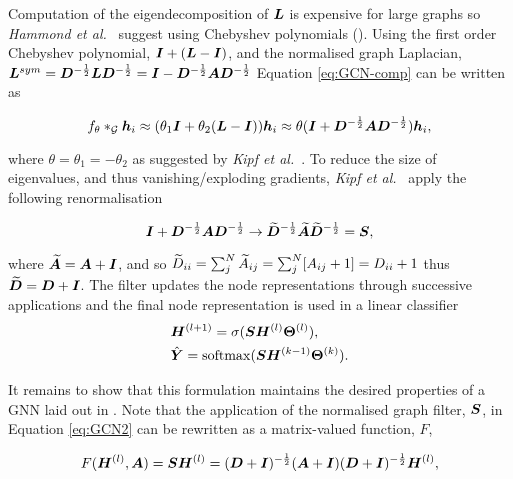 Computation of the eigendecomposition of ${\bm{L}}$ is expensive for large graphs so \textit{Hammond et al.}~\cite{hammond2011wavelets} suggest using Chebyshev polynomials ().
Using the first order Chebyshev polynomial, ${\bm{I}} + ({\bm{L}} - {\bm{I}})$, and the normalised graph Laplacian, ${\bm{L}}^{sym} = {\bm{D}}^{-\frac12}{\bm{L}}{\bm{D}}^{-\frac12} = {\bm{I}} - {\bm{D}}^{-\frac12}{\bm{A}}{\bm{D}}^{-\frac12}$ Equation \ref{eq:GCN-comp} can be written as 

\begin{equation}
    \label{eq:no-norm}
    f_\theta *_{\mathcal{G}} {\bm{h}}_i \approx (\theta_1{\bm{I}} + \theta_2({\bm{L}} - {\bm{I}})){\bm{h}}_i \approx \theta({\bm{I}} + {\bm{D}}^{-\frac12}{\bm{A}}{\bm{D}}^{-\frac12}){\bm{h}}_i,
\end{equation}

where $\theta = \theta_1 = - \theta_2$ as suggested by \textit{Kipf et al.}~\cite{kipf2016semi}.
To reduce the size of eigenvalues, and thus vanishing/exploding gradients, \textit{Kipf et al.}~\cite{kipf2016semi} apply the following renormalisation

\begin{equation}
    \label{eq:norm}
    {\bm{I}} + {\bm{D}}^{-\frac12}{\bm{A}}{\bm{D}}^{-\frac12} \to \widetilde{{\bm{D}}}^{-\frac12}\widetilde{{\bm{A}}}\widetilde{{\bm{D}}}^{-\frac12} = {\bm{S}},
\end{equation}

where $\widetilde{{\bm{A}}} = {\bm{A}} + {\bm{I}}$, and so $\widetilde{{D}}_{ii} = \sum_j^N \widetilde{{A}}_{ij} = \sum_j^N [{A}_{ij} + 1] = {D}_{ii} + 1$ thus $\widetilde{{\bm{D}}} = {\bm{D}} + {\bm{I}}$.
The filter updates the node representations through successive applications and the final node representation is used in a linear classifier
\begin{align}
    &{\bm{H}}^{(l+1)} = \sigma({\bm{S}}{\bm{H}}^{(l)}\bm{\Theta}^{(l)}), \label{eq:GCN2}\\
    &\hat{{\bm{Y}}} = \operatorname{softmax}({\bm{S}}{\bm{H}}^{(k-1)}\bm{\Theta}^{(k)}). \label{eq:cls}
\end{align}

It remains to show that this formulation maintains the desired properties of a GNN laid out in .
Note that the application of the normalised graph filter, ${\bm{S}}$, in Equation \ref{eq:GCN2} can be rewritten as a matrix-valued function, $F$,

\begin{equation}
    F({\bm{H}}^{(l)}, {\bm{A}}) = {\bm{S}}{\bm{H}}^{(l)} = ({\bm{D}} + {\bm{I}})^{-\frac12}({\bm{A}} + {\bm{I}})({\bm{D}} + {\bm{I}})^{-\frac12}{\bm{H}}^{(l)},
\end{equation}

